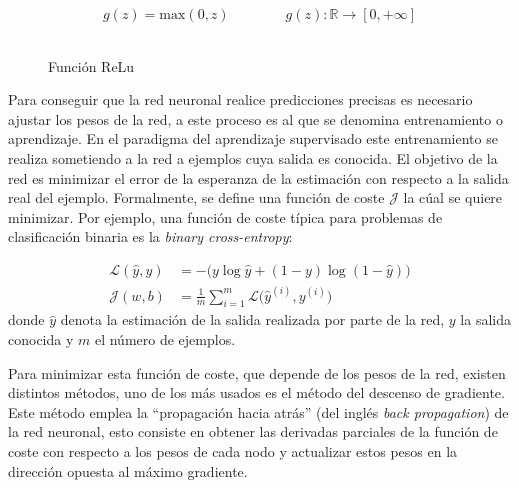 \begin{itemize}
	\begin{equation}
		g(z) = \text{max}(0,z) \qquad\qquad g(z):\mathbb{R} \rightarrow [0,+\infty]
	\end{equation}
\\
	\begin{figure}[htb!]
		\centering
		\caption{Función ReLu}
	\end{figure}
	

\end{itemize} 
  
 Para conseguir que la red neuronal realice predicciones precisas es necesario ajustar los pesos de la red, a este proceso es al que se denomina entrenamiento o aprendizaje. En el paradigma del aprendizaje supervisado este entrenamiento se realiza sometiendo a la red a ejemplos cuya salida es conocida. El objetivo de la red es minimizar el error de la esperanza de la estimación con respecto a la salida real del ejemplo. Formalmente, se define una función de coste $\mathcal{J}$ la cúal se quiere minimizar. Por ejemplo, una función de coste típica para problemas de clasificación binaria es la \textit{binary cross-entropy}:
 
 \begin{align}
 \mathcal{L}(\hat{y},y)&=-\big(y\log\hat{y} + (1-y)\log(1-\hat{y})\big)\\ 
 \mathcal{J}(w,b)&=\frac{1}{m}\sum_{i=1}^{m}{\mathcal{L}\big(\hat{y}^{(i)},{y}^{(i)}\big)}
 \end{align}
 donde $\hat{y}$ denota la estimación de la salida realizada por parte de la red, $y$ la salida conocida y $m$ el número de ejemplos. 
 
 Para minimizar esta función de coste, que depende de los pesos de la red, existen distintos métodos, uno de los más usados es el método del descenso de gradiente. Este método emplea la ``propagación hacia atrás'' (del inglés \textit{back propagation}) de la red neuronal, esto consiste en obtener las derivadas parciales de la función de coste con respecto a los pesos de cada nodo y actualizar estos pesos en la dirección opuesta al máximo gradiente.
 
